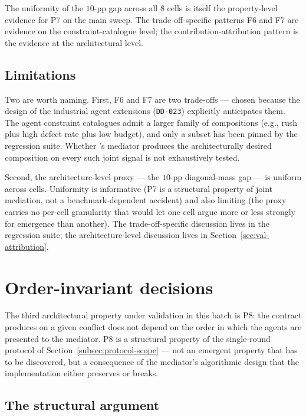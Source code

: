 The uniformity of the $10$-pp gap across all $8$ cells is itself
the property-level evidence for P7 on the main sweep. The
trade-off-specific patterns F6 and F7 are evidence on the
constraint-catalogue level; the contribution-attribution pattern is
the evidence at the architectural level.

\subsection*{Limitations}

Two are worth naming. First, F6 and F7 are two trade-offs ---
chosen because the design of the industrial agent extensions
(\texttt{DD-023}) explicitly anticipates them. The agent
constraint catalogues admit a larger family of compositions
(e.g., rush plus high defect rate plus low budget), and only a
subset has been pinned by the regression suite. Whether
\NEXUS{}'s mediator produces the architecturally desired
composition on every such joint signal is not exhaustively tested.

Second, the architecture-level proxy --- the $10$-pp diagonal-mass
gap --- is uniform across cells. Uniformity is informative
(P7 is a structural property of joint mediation, not a
benchmark-dependent accident) and also limiting (the proxy carries
no per-cell granularity that would let one cell argue more or less
strongly for emergence than another). The trade-off-specific
discussion lives in the regression suite; the
architecture-level discussion lives in
Section~\ref{sec:val-attribution}.

\section{Order-invariant decisions}
\label{sec:val-order}

The third architectural property under validation in this batch is
P8: the contract \NEXUS{} produces on a given conflict does not
depend on the order in which the agents are presented to the
mediator. P8 is a structural property of the single-round protocol
of Section~\ref{subsec:protocol-scope} --- not an emergent property
that has to be discovered, but a consequence of the mediator's
algorithmic design that the implementation either preserves or
breaks.

\subsection*{The structural argument}

